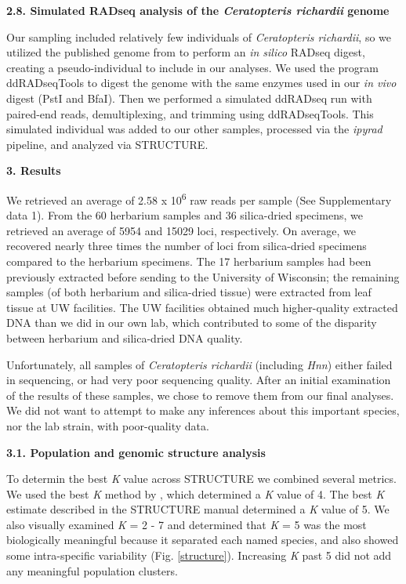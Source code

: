 \documentclass[12pt]{article}
\begin{document}
\begin{flushleft}
\textbf{2.8. Simulated RADseq analysis of the \textit{Ceratopteris richardii} genome}

Our sampling included relatively few individuals of \textit{Ceratopteris richardii}, so we utilized the published genome from \textcite{Marchant2019} to perform an \textit{in silico} RADseq digest, creating a pseudo-individual to include in our analyses. We used the program ddRADseqTools \autocite{Mora-Marquez2017} to digest the genome with the same enzymes used in our \textit{in vivo} digest (PstI and BfaI). Then we performed a simulated ddRADseq run with paired-end reads, demultiplexing, and trimming using ddRADseqTools. This simulated individual was added to our other samples, processed via the \textit{ipyrad} pipeline, and analyzed via STRUCTURE. 

\vspace{1cm}

{\large\textbf{3. Results}}

We retrieved an average of 2.58 x 10\textsuperscript{6} raw reads per sample (See Supplementary data 1). From the 60 herbarium samples and 36 silica-dried specimens, we retrieved an average of 5954 and 15029 loci, respectively. On average, we recovered nearly three times the number of loci from silica-dried specimens compared to the herbarium specimens. The 17 herbarium samples had been previously extracted before sending to the University of Wisconsin; the remaining samples (of both herbarium and silica-dried tissue) were extracted from leaf tissue at UW facilities. The UW facilities obtained much higher-quality extracted DNA than we did in our own lab, which contributed to some of the disparity between herbarium and silica-dried DNA quality.

Unfortunately, all samples of \textit{Ceratopteris richardii} (including \textit{Hnn}) either failed in sequencing, or had very poor sequencing quality. After an initial examination of the results of these samples, we chose to remove them from our final analyses. We did not want to attempt to make any inferences about this important species, nor the lab strain, with poor-quality data. 

\textbf{3.1. Population and genomic structure analysis}

To determin the best \textit{K} value across {\small{STRUCTURE}} we combined several metrics. We used the best \textit{K} method by \textcite{Evanno2005}, which determined a \textit{K} value of 4. The best \textit{K} estimate described in the {\small{STRUCTURE}} manual \autocite{Pritchard2000} determined a \textit{K} value of 5. We also visually examined \textit{K} = 2 - 7 and determined that \textit{K} = 5 was the most biologically meaningful because it separated each named species, and also showed some intra-specific variability (Fig. \ref{structure}). Increasing \textit{K} past 5 did not add any meaningful population clusters. 


\end{flushleft}
\end{document}
